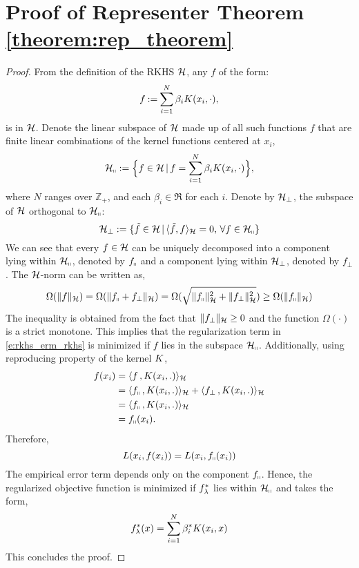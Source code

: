 \chapter{Proof of Representer Theorem \ref{theorem:rep_theorem}}%
\label{a:rep_theorem}

\begin{proof}
	From the definition of the RKHS ${\cal H}$, any $f$ of the form:
	\[
	f \mathbin{:=} \sum_{i=1}^N  
	\beta_i K(x_i,\cdot),
	\]
	is in ${\cal H}$. 	
	Denote the linear subspace of ${\cal H}$ made up of all such functions $f$ that are finite linear combinations of the kernel functions centered at $x_i$,
	\[
	{\cal H}_\shortparallel := \Bigl\{f \in {\cal H}\, |\, f = \sum_{i=1}^N  \beta_i K(x_i,\cdot) \Bigr\},
	\]
	where $N$ ranges over $\mathbb{Z}_+$, and  each $\beta_i \in \Re$ for each $i$. Denote by ${\cal H}_{\perp}$, the subspace of ${\cal H}$ orthogonal to ${\cal H}_\shortparallel$:
	\[
	{\cal H}_\perp : = \{ \tilde f \in {\cal H}\,| \, \langle \tilde f , f \rangle_{\cal H} = 0 ,\, \forall f \in {\cal H}_\shortparallel \}
	\]
	We can see that every $f \in {\cal H}$ can be uniquely decomposed into a component lying within ${\cal H}_\shortparallel$, denoted by $f_\shortparallel$ and a component lying within ${\cal H}_\perp$, denoted by $f_\perp$.
	The ${\cal H}$-norm can be written as,
	\[
	\Omega(\|f\|_{\cal H}) = \Omega( \|f_\shortparallel + f_\perp\|_{\cal H}) =\Omega( \sqrt{\|f_\shortparallel\|^2_{\cal H} + \|f_\perp\|^2_{\cal H}})  \geq \Omega(\|f_\shortparallel\|_{\cal H})
	\]
	The inequality is obtained from the fact that $\|f_\perp\|_{\cal H} \geq 0$ and the function $\Omega(\cdot)$ is a strict monotone.
	This implies that the regularization term in \eqref{e:rkhs_erm_rkhs} is minimized if $f$ lies in the subspace ${\cal H}_\shortparallel$.
	Additionally, using reproducing property of the kernel $K$,
	\[
	\begin{aligned}
	f(x_i) & =  \langle f \, , K(x_i,.) \rangle_{\cal H}\\
	&  = \langle f_\shortparallel\, , K(x_i,.) \rangle_{\cal H} + \langle f_\perp \, , K(x_i,.) \rangle_{\cal H} \\
	&  = \langle f_\shortparallel\, , K(x_i,.) \rangle_{\cal H} \\
	&  = f_\shortparallel(x_i).
	\end{aligned}
	\]
	Therefore,
	\[
	L(x_i, f(x_i)) = L(x_i, f_\shortparallel(x_i))
	\]
	The empirical error term depends only on the component $f_\shortparallel$. Hence, the regularized objective function is minimized if $f_\lambda^*$ lies within ${\cal H}_\shortparallel$ and takes the form,
	\[
	f_\lambda^*(x) = \sum_{i=1}^N  \beta_i^*  K(x_i, x)
	\]
	This concludes the proof. 
\end{proof}